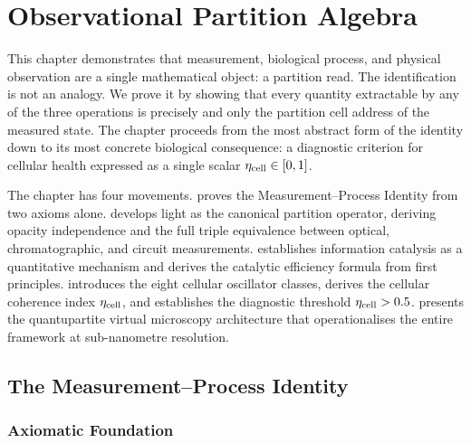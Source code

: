 ﻿%

\chapter{Observational Partition Algebra}
\label{ch:observation}
\label{ch:observational-algebra}

This chapter demonstrates that measurement, biological process, and physical
observation are a single mathematical object: a partition read.  The
identification is not an analogy.  We prove it by showing that every quantity
extractable by any of the three operations is precisely and only the partition
cell address of the measured state.  The chapter proceeds from the most abstract
form of the identity down to its most concrete biological consequence: a
diagnostic criterion for cellular health expressed as a single scalar
$\eta_{\mathrm{cell}} \in [0,1]$.

The chapter has four movements.   proves the
Measurement--Process Identity from two axioms alone.  
develops light as the canonical partition operator, deriving opacity
independence and the full triple equivalence between optical, chromatographic,
and circuit measurements.   establishes information
catalysis as a quantitative mechanism and derives the catalytic efficiency
formula from first principles.   introduces the
eight cellular oscillator classes, derives the cellular coherence index
$\eta_{\mathrm{cell}}$, and establishes the diagnostic threshold $\eta_{\mathrm{cell}} > 0.5$.
 presents the quantupartite virtual microscopy
architecture that operationalises the entire framework at sub-nanometre
resolution.

\section{The Measurement--Process Identity}
\label{sec:measurement-process}

\subsection{Axiomatic Foundation}

